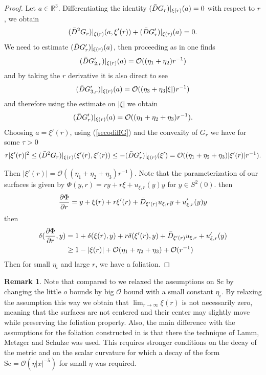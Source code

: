 \documentclass[12pt,a4paper]{amsart}
\theoremstyle{plain}
\theoremstyle{definition}
\newtheorem{remark}[theorem]{Remark}
\begin{document}
\begin{proof}
Let \(a \in \mathbb{R}^3\). Differentiating the identity \((\Bar{D} G_r)|_{\xi(r)}(a) = 0\) with respect to \(r\), we obtain
\begin{equation}\label{secodiffG}
    (\Bar{D}^2 G_r)|_{\xi(r)}(a, \xi^\prime (r)) + (\Bar{D} G^\prime_r)|_{\xi(r)} (a) = 0.
\end{equation}
 We need to estimate  $(\Bar{D}G^\prime_r)|_{\xi(r)} (a) $, then proceeding as in \cite[Proposition 49]{eichko} one finds 
 \begin{equation}
     (\Bar{D} G^\prime_{2,r})|_{\xi(r)} (a) = \mathcal{O}((\eta_1 +\eta_2) r^{-1})
 \end{equation}
 and by taking the $r$ derivative it is also direct to see
 \begin{equation}\label{dg3esti}
     (\Bar{D} G^\prime_{3,r})|_{\xi(r)} (a) = \mathcal{O}((\eta_3+\eta_3 |\xi| ) r^{-1})
 \end{equation}
 and therefore using the estimate on $|\xi|$ we obtain 
\begin{equation}
     (\Bar{D} G^\prime_r)|_{\xi(r)} (a) = \mathcal{O}((\eta_1 +\eta_2 +\eta_3) r^{-1}).
\end{equation}
Choosing $a= \xi'(r)  $, using (\ref{secodiffG}) and the convexity of $G_r$  we have for some $\tau>0$ 
$$\tau |\xi'(r)|^2\leq  (\Bar{D}^2 G_r)|_{\xi(r)}(\xi^\prime (r), \xi^\prime (r))  \leq - (\Bar{D} G^\prime_r)|_{\xi(r)} (\xi^\prime) = \mathcal{O}((\eta_1 +\eta_2 +\eta_3)|\xi'(r)| r^{-1}).$$

Then $|\xi'(r)|= \mathcal{O}((\eta_1 +\eta_2 +\eta_3)r^{-1})  $. Note that the parameterization of our surfaces is given by $ \Phi(y, r)= r y +r \xi +u_{\xi, r} (y) y$ for $ y\in S^2(0)$. then
$$ \frac{\partial \Phi}{\partial r} = y + \xi(r) +r \xi'(r )+ \Bar{D}_{\xi'(r)} u_{\xi, r} y+ u_{\xi, r} '(y) y  $$
then 
\begin{equation}
\begin{split}
    \delta( \frac{\partial \Phi}{\partial r}, y ) &=1 + \delta( \xi(r),y ) +r \delta( \xi'(r ),y) + \Bar{D}_{\xi'(r)} u_{\xi, r} + u_{\xi, r} '(y) \\
    &\geq 1 -|\xi(r)| + \mathcal{O}(\eta_1 +\eta_2 +\eta_3)  +\mathcal{O}( r^{-1})
    \end{split}
\end{equation}
Then for small $\eta_i$ and large $r$, we have a foliation.
\end{proof}
\begin{remark}
Note that compared to \cite{eichko} we relaxed  the assumptions on $\mathrm{Sc}$ by changing the little $o$ bounds by big $\mathcal{O}$ bound with a small constant $\eta_i$. By relaxing the assumption this way we obtain that   $\lim_{r \to \infty} \xi(r)$ is not necessarily zero, meaning that the surfaces are not centered and their center may slightly move while preserving the foliation property.  Also, the main difference with the assumptions for the foliation constructed in \cite{Friedrich2020} is that there the technique of Lamm, Metzger and Schulze \cite{willflat} was used. This requires stronger conditions on the decay of the metric and on the scalar curvature for which a decay of the form $ \mathrm{Sc}=\mathcal{O}(\eta |x|^{-5}) $ for small $\eta$ was required.
\end{remark}
\end{document}
